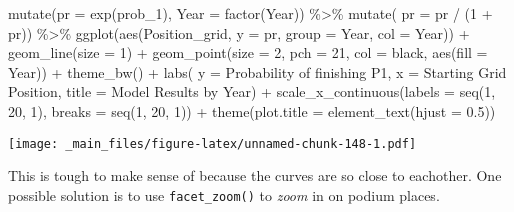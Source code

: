 \documentclass[
]{book}
\newenvironment{Shaded}{\begin{snugshade}}{\end{snugshade}}
\newcommand{\AttributeTok}[1]{\textcolor[rgb]{0.77,0.63,0.00}{#1}}
\newcommand{\DecValTok}[1]{\textcolor[rgb]{0.00,0.00,0.81}{#1}}
\newcommand{\FloatTok}[1]{\textcolor[rgb]{0.00,0.00,0.81}{#1}}
\newcommand{\FunctionTok}[1]{\textcolor[rgb]{0.00,0.00,0.00}{#1}}
\newcommand{\NormalTok}[1]{#1}
\newcommand{\SpecialCharTok}[1]{\textcolor[rgb]{0.00,0.00,0.00}{#1}}
\newcommand{\StringTok}[1]{\textcolor[rgb]{0.31,0.60,0.02}{#1}}
\begin{document}
\begin{Shaded}
\begin{Highlighting}[]
  \FunctionTok{mutate}\NormalTok{(}\AttributeTok{pr =} \FunctionTok{exp}\NormalTok{(prob\_1),}
         \AttributeTok{Year =} \FunctionTok{factor}\NormalTok{(Year)) }\SpecialCharTok{\%\textgreater{}\%} 
  \FunctionTok{mutate}\NormalTok{( }\AttributeTok{pr =}\NormalTok{ pr }\SpecialCharTok{/}\NormalTok{ (}\DecValTok{1} \SpecialCharTok{+}\NormalTok{ pr)) }\SpecialCharTok{\%\textgreater{}\%} 
  \FunctionTok{ggplot}\NormalTok{(}\FunctionTok{aes}\NormalTok{(Position\_grid, }\AttributeTok{y =}\NormalTok{ pr, }\AttributeTok{group  =}\NormalTok{ Year, }\AttributeTok{col =}\NormalTok{ Year)) }\SpecialCharTok{+}
  \FunctionTok{geom\_line}\NormalTok{(}\AttributeTok{size =} \DecValTok{1}\NormalTok{) }\SpecialCharTok{+} 
  \FunctionTok{geom\_point}\NormalTok{(}\AttributeTok{size =} \DecValTok{2}\NormalTok{, }\AttributeTok{pch =} \DecValTok{21}\NormalTok{, }\AttributeTok{col =} \StringTok{\textquotesingle{}black\textquotesingle{}}\NormalTok{, }\FunctionTok{aes}\NormalTok{(}\AttributeTok{fill =}\NormalTok{ Year)) }\SpecialCharTok{+}
  \FunctionTok{theme\_bw}\NormalTok{() }\SpecialCharTok{+}
  \FunctionTok{labs}\NormalTok{( }\AttributeTok{y =} \StringTok{\textquotesingle{}Probability of finishing P1\textquotesingle{}}\NormalTok{,}
        \AttributeTok{x =} \StringTok{\textquotesingle{}Starting Grid Position\textquotesingle{}}\NormalTok{,}
        \AttributeTok{title =} \StringTok{\textquotesingle{}Model Results by Year\textquotesingle{}}\NormalTok{) }\SpecialCharTok{+}
  \FunctionTok{scale\_x\_continuous}\NormalTok{(}\AttributeTok{labels =} \FunctionTok{seq}\NormalTok{(}\DecValTok{1}\NormalTok{, }\DecValTok{20}\NormalTok{, }\DecValTok{1}\NormalTok{),}
                     \AttributeTok{breaks =} \FunctionTok{seq}\NormalTok{(}\DecValTok{1}\NormalTok{, }\DecValTok{20}\NormalTok{, }\DecValTok{1}\NormalTok{)) }\SpecialCharTok{+}
  \FunctionTok{theme}\NormalTok{(}\AttributeTok{plot.title =} \FunctionTok{element\_text}\NormalTok{(}\AttributeTok{hjust =} \FloatTok{0.5}\NormalTok{))}
\end{Highlighting}
\end{Shaded}

\texttt{[image: \_main\_files/figure-latex/unnamed-chunk-148-1.pdf]}

This is tough to make sense of because the curves are so close to eachother. One possible solution is to use \texttt{facet\_zoom()} to \emph{zoom} in on podium places.
\end{document}
